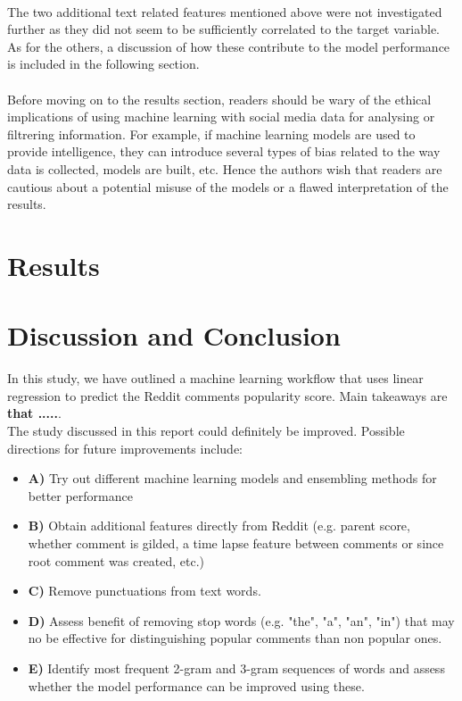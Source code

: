 \documentclass[11pt]{article}
\begin{document}
\\
The two additional text related features mentioned above were not investigated further as they did not seem to be sufficiently correlated to the target variable. As for the others, a discussion of how these contribute to the model performance is included in the following section.\\
\\
Before moving on to the results section, readers should be wary of the ethical implications of using machine learning with social media data for analysing or filtrering information. For example, if machine learning models are used to provide intelligence, they can introduce several types of bias related to the way data is collected, models are built, etc. Hence the authors wish that readers are cautious about a potential misuse of the models or a flawed interpretation of the results. 

\section{Results}



\section{Discussion and Conclusion}
In this study, we have outlined a machine learning workflow that uses linear regression to predict the Reddit comments popularity score. Main takeaways are \textbf{that .....}.
\\
The study discussed in this report could definitely be improved. Possible directions for future improvements include: 
\begin{itemize}
    	\item \textbf{A)} Try out different machine learning models and ensembling methods for better performance
   	\item \textbf{B)} Obtain additional features directly from Reddit (e.g. parent score, whether comment is gilded, a time lapse feature between comments or since root comment was created, etc.)
    	\item \textbf{C)} Remove punctuations from text words.
 	\item \textbf{D)} Assess benefit of removing stop words (e.g. "the", "a", "an", "in") that may no be effective for distinguishing popular comments than non popular ones. 
	\item \textbf{E)} Identify most frequent 2-gram and 3-gram sequences of words and assess whether the model performance can be improved using these.
\end{itemize}
\end{document}
